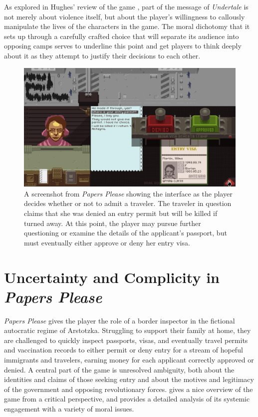 \documentclass[arts,article,submit,moreauthors,pdftex,10pt,a4paper]{Definitions/mdpi}
\begin{document}
As explored in Hughes' review of the game \citeyear{hughes2015undertale}, part of the message of \emph{Undertale} is not merely about violence itself, but about the player's willingness to callously manipulate the lives of the characters in the game.
%
The moral dichotomy that it sets up through a carefully crafted choice that will separate its audience into opposing camps serves to underline this point and get players to think deeply about it as they attempt to justify their decisions to each other.

\begin{figure}[H]
  \includegraphics[width=\textwidth]{fig/papers-please-visa-choice.png}
  \caption{A screenshot from \emph{Papers Please} showing the interface as the player decides whether or not to admit a traveler. The traveler in question claims that she was denied an entry permit but will be killed if turned away. At this point, the player may pursue further questioning or examine the details of the applicant's passport, but must eventually either approve or deny her entry visa.}
  \label{fig:PP_visa}
\end{figure}

\section{Uncertainty and Complicity in \emph{Papers Please}}

\emph{Papers Please} \citep{pope2013papers} gives the player the role of a border inspector in the fictional autocratic regime of Arstotzka.
%
Struggling to support their family at home, they are challenged to quickly inspect passports, visas, and eventually travel permits and vaccination records to either permit or deny entry for a stream of hopeful immigrants and travelers, earning money for each applicant correctly approved or denied.
%
A central part of the game is unresolved ambiguity, both about the identities and claims of those seeking entry and about the motives and legitimacy of the government and opposing revolutionary forces.
%
\cite{alexander2013designing} gives a nice overview of the game from a critical perspective, and \cite{formosa2016papers} provides a detailed analysis of its systemic engagement with a variety of moral issues.
\end{document}
